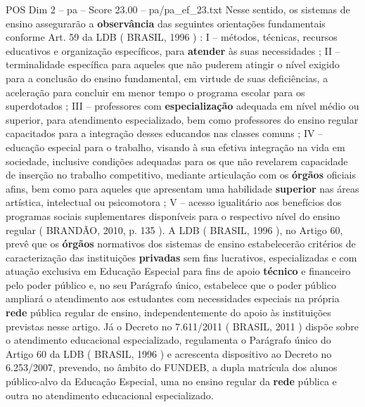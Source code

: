 \begin{textsample}{POS Dim 2 – pa – Score 23.00 – pa/pa\_ef\_23.txt}
Nesse sentido, os sistemas de ensino assegurarão a \textbf{observância} das seguintes orientações fundamentais conforme Art. 59 da LDB ( BRASIL, 1996 ) : I – métodos, técnicas, recursos educativos e organização específicos, para \textbf{atender} às suas necessidades ; II – terminalidade específica para aqueles que não puderem atingir o nível exigido para a conclusão do ensino fundamental, em virtude de suas deficiências, a aceleração para concluir em menor tempo o programa escolar para os superdotados ; III – professores com \textbf{especialização} adequada em nível médio ou superior, para atendimento especializado, bem como professores do ensino regular capacitados para a integração desses educandos nas classes comuns ; IV – educação especial para o trabalho, visando à sua efetiva integração na vida em sociedade, inclusive condições adequadas para os que não revelarem capacidade de inserção no trabalho competitivo, mediante articulação com os \textbf{órgãos} oficiais afins, bem como para aqueles que apresentam uma habilidade \textbf{superior} nas áreas artística, intelectual ou psicomotora ; V – acesso igualitário aos benefícios dos programas sociais suplementares disponíveis para o respectivo nível do ensino regular ( BRANDÃO, 2010, p. 135 ).
A LDB ( BRASIL, 1996 ), no Artigo 60, prevê que os \textbf{órgãos} normativos dos sistemas de ensino estabelecerão critérios de caracterização das instituições \textbf{privadas} sem fins lucrativos, especializadas e com atuação exclusiva em Educação Especial para fins de apoio \textbf{técnico} e financeiro pelo poder público e, no seu Parágrafo único, estabelece que o poder público ampliará o atendimento aos estudantes com necessidades especiais na própria \textbf{rede} pública regular de ensino, independentemente do apoio às instituições previstas nesse artigo.
Já o Decreto no 7.611/2011 ( BRASIL, 2011 ) dispõe sobre o atendimento educacional especializado, regulamenta o Parágrafo único do Artigo 60 da LDB ( BRASIL, 1996 ) e acrescenta dispositivo ao Decreto no 6.253/2007, prevendo, no âmbito do FUNDEB, a dupla matrícula dos alunos público-alvo da Educação Especial, uma no ensino regular da \textbf{rede} pública e outra no atendimento educacional especializado.

\end{textsample}
